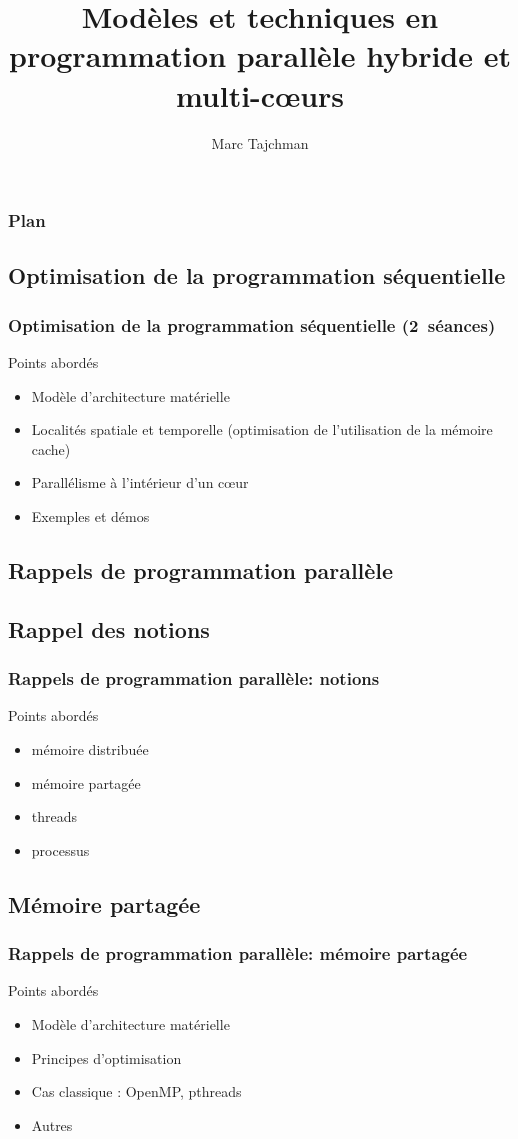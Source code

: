 \documentclass{beamer}
\title{Modèles et techniques en programmation parallèle hybride et multi-c\oe urs}
\author{Marc Tajchman}\institute{CEA - DEN/DM2S/STMF/LMES}
\begin{document}
\begin{frame}
\titlepage
\end{frame}

\Large
\begin{frame}
  	\frametitle{Plan}
  	\tableofcontents
\end{frame}

\begin{frame}
\section{Optimisation de la programmation séquentielle}
\frametitle{Optimisation de la programmation séquentielle \hbox{(2 séances)}}
Points abordés
\begin{itemize}
\item Modèle d'architecture matérielle
\item Localités spatiale et temporelle (optimisation de l'utilisation de la mémoire cache)
\item Parallélisme à l'intérieur d'un c\oe ur
\item Exemples et démos
\end{itemize}
\end{frame}

\begin{frame}
\section{Rappels de programmation parallèle}
\subsection{Rappel des notions}
\frametitle{Rappels de programmation parallèle: notions}
Points abordés
\begin{itemize}
\item mémoire distribuée
\item mémoire partagée
\item threads
\item processus
\end{itemize}
\end{frame}

\begin{frame}
\subsection{Mémoire partagée}
\frametitle{Rappels de programmation parallèle: mémoire partagée}
Points abordés
\begin{itemize}
\item Modèle d'architecture matérielle
\item Principes d'optimisation
\item Cas classique : OpenMP, pthreads
\item Autres
\end{itemize}
\end{frame}
\end{document}

